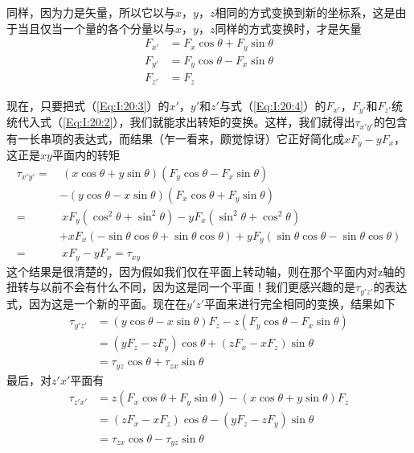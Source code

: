 同样，因为力是矢量，所以它以与$x$，$y$，$z$相同的方式变换到新的坐标系，这是由于当且仅当一个量的各个分量以与$x$，$y$，$z$同样的方式变换时，才是矢量
\begin{equation}
    \label{Eq:I:20:4}
    \begin{aligned}
        F_{x'} &= F_x \cos \theta + F_y \sin \theta \\
        F_{y'} &= F_y \cos \theta - F_x \sin \theta \\
        F_{z'} &= F_z
    \end{aligned}
\end{equation}

现在，只要把式（\ref{Eq:I:20:3}）的$x'$，$y'$和$z'$与式（\ref{Eq:I:20:4}）的$F_{x'}$，$F_{y'}$和$F_{z'}$统统代入式（\ref{Eq:I:20:2}），我们就能求出转矩的变换。这样，我们就得出$\tau_{x'y'}$的包含有一长串项的表达式，而结果（乍一看来，颇觉惊讶）它正好简化成$xF_y-yF_x$，这正是$xy$平面内的转矩
\begin{equation}
    \label{Eq:I:20:5}
    \begin{aligned}
        \tau_{x'y'} = &~(x\cos \theta + y \sin \theta)(F_y \cos \theta - F_x \sin \theta) \\
        &- (y\cos \theta - x \sin \theta)(F_x \cos \theta + F_y \sin \theta) \\
        = &~xF_y(\cos^2 \theta + \sin^2 \theta) - yF_x(\sin^2 \theta + \cos^2 \theta) \\
        &+ xF_x(-\sin \theta \cos \theta + \sin \theta \cos \theta) + yF_y(\sin \theta \cos \theta - \sin \theta \cos \theta) \\
        = &~xF_y - yF_x = \tau_{xy}
    \end{aligned}
\end{equation}
这个结果是很清楚的，因为假如我们仅在平面上转动轴，则在那个平面内对z轴的扭转与以前不会有什么不同，因为这是同一个平面！我们更感兴趣的是$\tau_{y'z'}$的表达式，因为这是一个新的平面。现在在$y'z'$平面来进行完全相同的变换，结果如下
\begin{equation}
    \label{Eq:I:20:6}
    \begin{aligned}
        \tau_{y'z'} &= (y \cos \theta - x \sin \theta)F_z - z(F_y \cos \theta - F_x \sin \theta) \\
        &= (yF_z - zF_y)\cos \theta + (zF_x - xF_z)\sin \theta \\
        &= \tau_{yz} \cos \theta + \tau_{zx} \sin \theta
    \end{aligned}
\end{equation}
最后，对$z'x'$平面有
\begin{equation}
    \label{Eq:I:20:7}
    \begin{aligned}
        \tau_{z'x'}&=z(F_x\cos\theta+F_y\sin\theta)-(x\cos\theta+y\sin\theta)F_z \\
        &=(zF_x-xF_z)\cos\theta-(yF_z-zF_y)\sin\theta \\
        &=\tau_{zx}\cos\theta-\tau_{yz}\sin\theta
    \end{aligned}
\end{equation}

